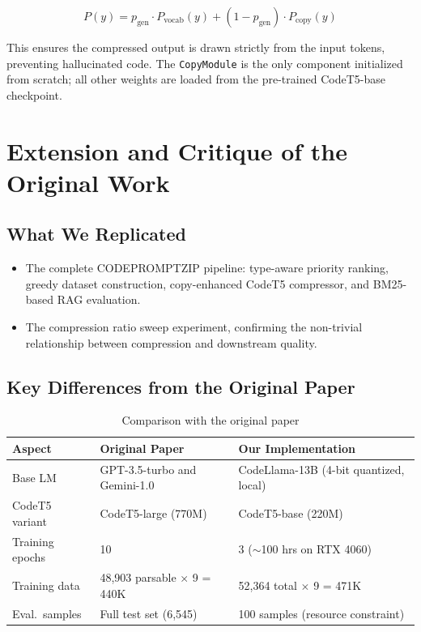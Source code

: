 \documentclass[11pt,a4paper]{article}
\begin{document}
\begin{equation}
  P(y) = p_{\text{gen}} \cdot P_{\text{vocab}}(y) + (1 - p_{\text{gen}}) \cdot P_{\text{copy}}(y)
\end{equation}

This ensures the compressed output is drawn strictly from the input tokens, preventing hallucinated code. The \texttt{CopyModule} is the only component initialized from scratch; all other weights are loaded from the pre-trained CodeT5-base checkpoint.

\section{Extension and Critique of the Original Work}

\subsection*{What We Replicated}

\begin{itemize}[leftmargin=1.5em]
  \item The complete CODEPROMPTZIP pipeline: type-aware priority ranking, greedy dataset construction, copy-enhanced CodeT5 compressor, and BM25-based RAG evaluation.
  \item The compression ratio sweep experiment, confirming the non-trivial relationship between compression and downstream quality.
\end{itemize}

\subsection*{Key Differences from the Original Paper}

\begin{table}[H]
  \centering
  \caption{Comparison with the original paper}
  \label{tab:differences}
  \renewcommand{\arraystretch}{1.15}
  \begin{tabularx}{\textwidth}{L{3cm} X X}
    \toprule
    \textbf{Aspect} & \textbf{Original Paper} & \textbf{Our Implementation} \\
    \midrule
    Base LM          & GPT-3.5-turbo and Gemini-1.0           & CodeLlama-13B (4-bit quantized, local) \\
    CodeT5 variant   & CodeT5-large (770M)                   & CodeT5-base (220M) \\
    Training epochs  & 10                                    & 3 ($\sim$100 hrs on RTX 4060) \\
    Training data    & 48,903 parsable $\times$ 9 = 440K     & 52,364 total $\times$ 9 = 471K \\
    Eval.\ samples   & Full test set (6,545)                 & 100 samples (resource constraint) \\
    \bottomrule
  \end{tabularx}
\end{table}
\end{document}
